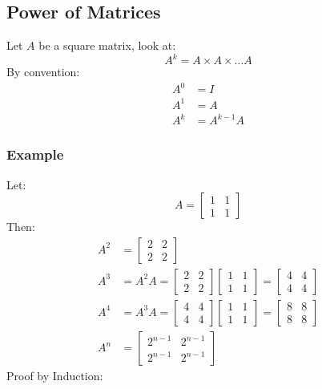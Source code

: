 \documentclass[letterpaper, 12pt]{math}
\begin{document}
\subsection*{Power of Matrices}
Let \( A \) be a square matrix, look at:
\[ A^k = A\times A\times\dots A \]
By convention:
\begin{align*}
  A^0 &= I \\
  A^1 &= A \\
  A^k &= A^{k-1}A
\end{align*}

\subsubsection*{Example}
Let:
\[ A = \begin{bmatrix}1 & 1 \\ 1 & 1\end{bmatrix} \]
Then:
\begin{align*}
  A^2 &= \begin{bmatrix}2 & 2 \\ 2 & 2\end{bmatrix} \\
  A^3 &= A^2A = \begin{bmatrix}2 & 2 \\ 2 & 2\end{bmatrix}
    \begin{bmatrix}1 & 1 \\ 1 & 1\end{bmatrix} =
    \begin{bmatrix}4 & 4 \\ 4 & 4\end{bmatrix} \\
  A^4 &= A^3A = \begin{bmatrix}4 & 4 \\ 4 & 4\end{bmatrix}
    \begin{bmatrix}1 & 1 \\ 1 & 1\end{bmatrix} =
    \begin{bmatrix}8 & 8 \\ 8 & 8\end{bmatrix} \\
  A^n &= \begin{bmatrix} 2^{n-1} & 2^{n-1} \\ 2^{n-1} & 2^{n-1}\end{bmatrix}
\end{align*}
Proof by Induction:
\end{document}
